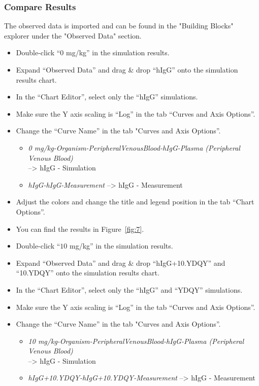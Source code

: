 \documentclass[fleqn,10pt]{physiome}
\begin{document}
\subsubsection{Compare Results}
The observed data is imported and can be found in the "Building Blocks" explorer under the "Observed Data" section.
\begin{itemize}
    \item Double-click ``$0$ mg/kg'' in the simulation results.
    \item Expand ``Observed Data'' and drag \& drop ``hIgG'' onto the simulation results chart.
    \item In the ``Chart Editor'', select only the ``hIgG'' simulations.
    \item Make sure the Y axis scaling is ``Log'' in the tab ``Curves and Axis Options''.
    \item Change the ``Curve Name'' in the tab "Curves and Axis Options''.
    \begin{itemize}
        \item \textit{0 mg/kg-Organism-PeripheralVenousBlood-hIgG-Plasma (Peripheral Venous Blood)} 
        \\--> hIgG - Simulation
        \item \textit{hIgG-hIgG-Measurement} --> hIgG - Measurement
    \end{itemize}
    \item Adjust the colors and change the title and legend position in the tab ``Chart Options''.
    \item You can find the results in Figure~\ref{fig:7}.
    \item Double-click ``$10$ mg/kg'' in the simulation results.
    \item Expand ``Observed Data'' and drag \& drop ``hIgG+10.YDQY'' and ``10.YDQY'' onto the simulation results chart.
    \item In the ``Chart Editor'', select only the ``hIgG'' and ``YDQY'' simulations.
    \item Make sure the Y axis scaling is ``Log'' in the tab ``Curves and Axis Options''.
    \item Change the ``Curve Name'' in the tab "Curves and Axis Options''.
    \begin{itemize}
        \item \textit{10 mg/kg-Organism-PeripheralVenousBlood-hIgG-Plasma (Peripheral Venous Blood)} 
        \\--> hIgG -  Simulation
        \item \textit{hIgG+10.YDQY-hIgG+10.YDQY-Measurement} --> hIgG - Measurement

\end{itemize}
\end{itemize}
\end{document}
